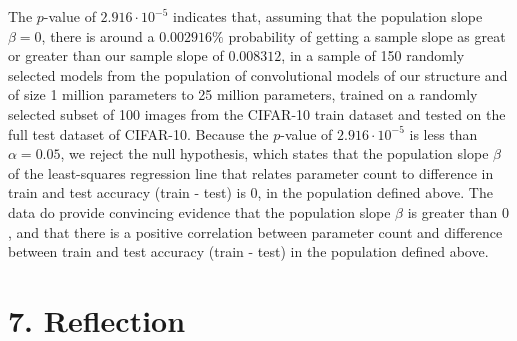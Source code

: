 \documentclass[12pt]{article}
\begin{document}
    The $p$-value of $2.916\cdot10^{-5}$ indicates that, assuming that the population slope $\beta=0$, there is around a
    $0.002916\%$ probability of getting a sample slope as great or greater than our sample slope of $0.008312$, in a sample of
    150 randomly selected models from the population of convolutional models of our structure and of size 1 million parameters to 25 million parameters, trained
    on a randomly selected subset of 100 images from the CIFAR-10 train dataset and tested on the full test dataset of CIFAR-10.
    Because the $p$-value of $2.916\cdot10^{-5}$ is less than $\alpha=0.05$, we reject the null hypothesis, which states that the population slope $\beta$
    of the least-squares regression line that relates parameter count to difference in train and test accuracy (train - test) is $0$,
    in the population defined above.
    The data do provide convincing evidence that the population slope $\beta$ is greater than $0$, and that there is a positive correlation between
    parameter count and difference between train and test accuracy (train - test) in the population defined above.


    \section*{7. Reflection}
\end{document}
